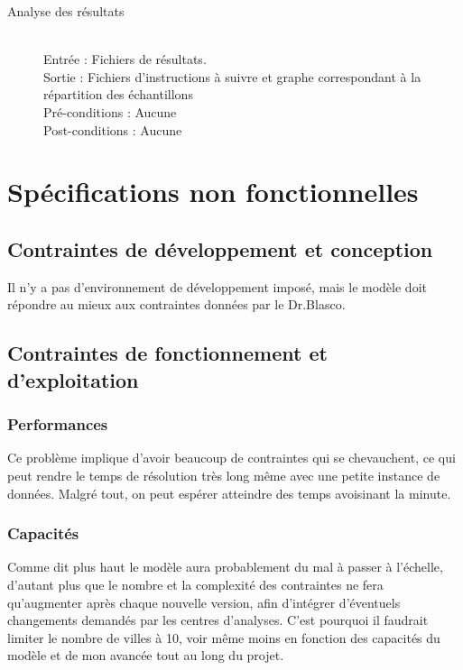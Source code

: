 \documentclass{polytech/polytech}
\numberwithin{figure}{chapter}
\begin{document}
\begin{appendix}
\begin{description}
    \item[Analyse des résultats] ~ \\
        Entrée : Fichiers de résultats.\\ 
        Sortie : Fichiers d'instructions à suivre et graphe correspondant à la répartition des échantillons \\
        Pré-conditions : Aucune\\
        Post-conditions : Aucune
\end{description}

\section{Spécifications non fonctionnelles}

\subsection{Contraintes de développement et conception}

Il n'y a pas d'environnement de développement imposé, mais le modèle doit répondre au mieux aux contraintes données par le Dr.Blasco.

\subsection{Contraintes de fonctionnement et d’exploitation}

\subsubsection{Performances}
Ce problème implique d'avoir beaucoup de contraintes qui se chevauchent, ce qui peut rendre le temps de résolution très long même avec une petite instance de données. Malgré tout, on peut espérer atteindre des temps avoisinant la minute.

\subsubsection{Capacités}
Comme dit plus haut le modèle aura probablement du mal à passer à l'échelle, d'autant plus que le nombre et la complexité des contraintes ne fera qu'augmenter après chaque nouvelle version, afin d'intégrer d'éventuels changements demandés par les centres d'analyses. C'est pourquoi il faudrait limiter le nombre de villes à 10, voir même moins en fonction des capacités du modèle et de mon avancée tout au long du projet. 


\end{appendix}
\end{document}
